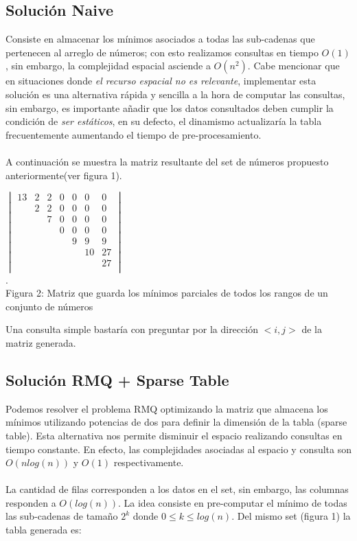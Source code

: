 \documentclass[11pt]{article}
\begin{document}
\subsection{Solución Naive}
Consiste en almacenar los mínimos asociados a todas las sub-cadenas que pertenecen al arreglo de números; con esto realizamos consultas en tiempo $O(1)$, sin embargo, la complejidad espacial asciende a $O(n^2)$. Cabe mencionar que en situaciones donde \emph{el recurso espacial no es relevante}, implementar esta solución es una alternativa rápida y sencilla a la hora de computar las consultas, sin embargo, es importante añadir que los datos consultados deben cumplir la condición de \emph{ser estáticos}, en su defecto, el dinamismo actualizaría la tabla frecuentemente aumentando el tiempo de pre-procesamiento.\\\\A continuación se muestra la matriz resultante del set de números propuesto anteriormente(ver figura 1).
\begin{center}$\begin{vmatrix}
	13 & 2 & 2 & 0 & 0 & 0 & 0 \\
	 & 2 & 2 & 0 & 0 & 0 & 0 \\
	 &  & 7 & 0 & 0 & 0 & 0 \\
	 &  &  & 0 & 0 & 0 & 0 \\
	 &  &  &  & 9 & 9 & 9 \\
	 &  &  &  &  & 10 & 27 \\
	 &  &  &  &  &  & 27 \\
\end{vmatrix}$
\\\scriptsize{\color{white}.\color{black}\\Figura 2: Matriz que guarda los mínimos parciales de todos los rangos de un conjunto de números}
\end{center}
Una consulta simple bastaría con preguntar por la dirección $<i,j>$ de la matriz generada.

\subsection{Solución RMQ + Sparse Table}
Podemos resolver el problema RMQ optimizando la matriz que almacena los mínimos utilizando potencias de dos para definir la dimensión de la tabla (sparse table). Esta alternativa nos permite disminuir el espacio realizando consultas en tiempo constante. En efecto, las complejidades asociadas al espacio y consulta son $O(nlog(n))$ y $O(1)$ respectivamente.\\\\La cantidad de filas corresponden a los datos en el set, sin embargo, las columnas responden a $O(log(n))$. La idea consiste en pre-computar el mínimo de todas las sub-cadenas de tamaño $2^k$ donde $0 \le k \le log(n)$. Del mismo set (figura 1) la tabla generada es:
\end{document}
